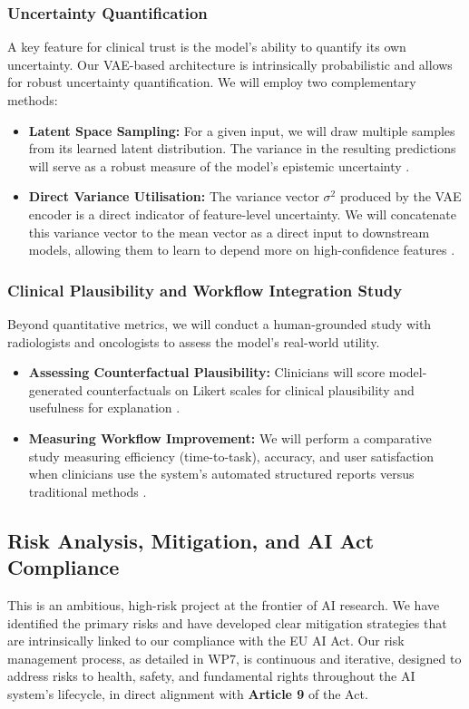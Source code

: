 \documentclass[11pt, a4paper]{article}
\begin{document}
\subsubsection{Uncertainty Quantification}
A key feature for clinical trust is the model's ability to quantify its own uncertainty. Our VAE-based architecture is intrinsically probabilistic and allows for robust uncertainty quantification. We will employ two complementary methods:
\begin{itemize}
    \item \textbf{Latent Space Sampling:} For a given input, we will draw multiple samples from its learned latent distribution. The variance in the resulting predictions will serve as a robust measure of the model's epistemic uncertainty \cite{BustinMeyer2025}.
    \item \textbf{Direct Variance Utilisation:} The variance vector $\sigma^2$ produced by the VAE encoder is a direct indicator of feature-level uncertainty. We will concatenate this variance vector to the mean vector as a direct input to downstream models, allowing them to learn to depend more on high-confidence features \cite{FriedrichFrisch2024}.
\end{itemize}

\subsubsection{Clinical Plausibility and Workflow Integration Study}
Beyond quantitative metrics, we will conduct a human-grounded study with radiologists and oncologists to assess the model's real-world utility.
\begin{itemize}
    \item \textbf{Assessing Counterfactual Plausibility:} Clinicians will score model-generated counterfactuals on Likert scales for clinical plausibility and usefulness for explanation \cite{GuoDeng2024, RossiLopez2024}.
    \item \textbf{Measuring Workflow Improvement:} We will perform a comparative study measuring efficiency (time-to-task), accuracy, and user satisfaction when clinicians use the system's automated structured reports versus traditional methods \cite{UnknownAuthor2020}.
\end{itemize}

\subsection{Risk Analysis, Mitigation, and AI Act Compliance}
This is an ambitious, high-risk project at the frontier of AI research. We have identified the primary risks and have developed clear mitigation strategies that are intrinsically linked to our compliance with the EU AI Act. Our risk management process, as detailed in WP7, is continuous and iterative, designed to address risks to health, safety, and fundamental rights throughout the AI system's lifecycle, in direct alignment with \textbf{Article 9} of the Act.
\end{document}
